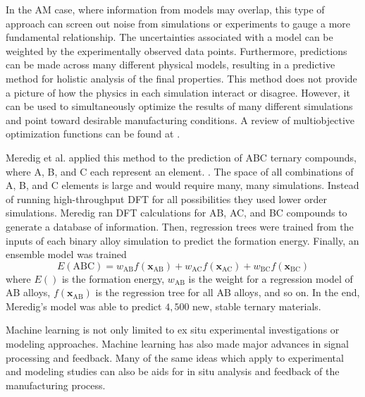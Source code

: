 In the AM case, where information from models may overlap, this type of approach can screen out noise from simulations or experiments to gauge a more fundamental relationship. The uncertainties associated with a model can be weighted by the experimentally observed data points. Furthermore, predictions can be made across many different physical models, resulting in a predictive method for holistic analysis of the final properties. This method does not provide a picture of how the physics in each simulation interact or disagree. However, it can be used to simultaneously optimize the results of many different simulations and point toward desirable manufacturing conditions. A review of multiobjective optimization functions can be found at \cite{Jin2008}.

Meredig et al. applied this method to the prediction of ABC ternary compounds, where A, B, and C each represent an element. \cite{Meredig2014}. The space of all combinations of A, B, and C elements is large and would require many, many simulations. Instead of running high-throughput DFT for all possibilities they used lower order simulations. Meredig ran DFT calculations for AB, AC, and BC compounds to generate a database of information. Then, regression trees were trained from the inputs of each binary alloy simulation to predict the formation energy. Finally, an ensemble model was trained
\begin{equation}
	E(\text{ABC}) = w_{\text{AB}} f(\mathbf{x}_{\text{AB}}) + w_{\text{AC}} f(\mathbf{x}_{\text{AC}}) + w_{\text{BC}} f(\mathbf{x}_{\text{BC}})
	\label{dftensemble}
\end{equation}
where $E()$ is the formation energy, $w_\text{AB}$ is the weight for a regression model of AB alloys, $f(\mathbf{x}_{\text{AB}})$ is the regression tree for all AB alloys, and so on. In the end, Meredig's model was able to predict $4,500$ new, stable ternary materials. 

Machine learning is not only limited to ex situ experimental investigations or modeling approaches. Machine learning has also made major advances in signal processing and feedback. Many of the same ideas which apply to experimental and modeling studies can also be aids for in situ analysis and feedback of the manufacturing process. 